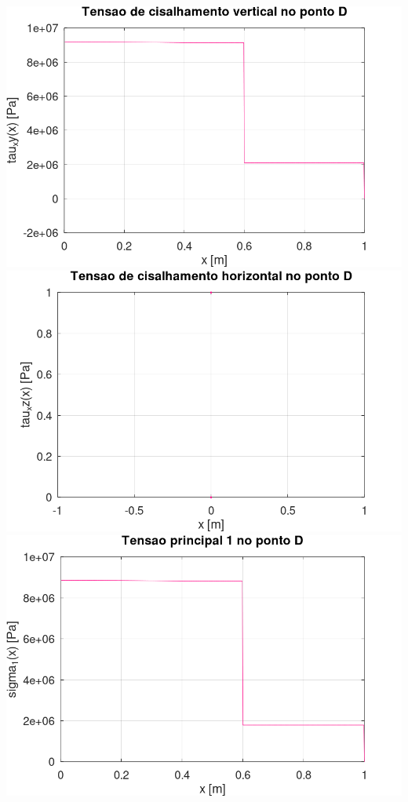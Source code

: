 \documentclass[10pt]{article}
\begin{document}
\begin{center}
    \includegraphics[scale=0.25]{figure37.png}
    \includegraphics[scale=0.25]{figure38.png}
    \includegraphics[scale=0.25]{figure39.png}

\end{center}
\end{document}
